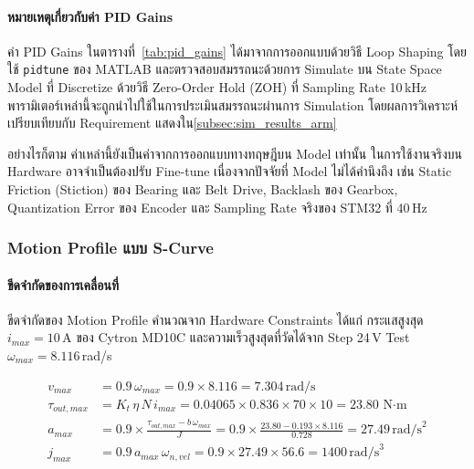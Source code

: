 \paragraph{หมายเหตุเกี่ยวกับค่า PID Gains}

ค่า PID Gains ในตารางที่~\ref{tab:pid_gains} ได้มาจากการออกแบบด้วยวิธี 
Loop Shaping โดยใช้ \texttt{pidtune} ของ MATLAB 
และตรวจสอบสมรรถนะด้วยการ Simulate บน State Space Model 
ที่ Discretize ด้วยวิธี Zero-Order Hold (ZOH) ที่ Sampling Rate 10\,kHz
พารามิเตอร์เหล่านี้จะถูกนำไปใช้ในการประเมินสมรรถนะผ่านการ Simulation โดยผลการวิเคราะห์เปรียบเทียบกับ Requirement แสดงใน\cref{subsec:sim_results_arm}

อย่างไรก็ตาม ค่าเหล่านี้ยังเป็นค่าจากการออกแบบทางทฤษฎีบน Model เท่านั้น
ในการใช้งานจริงบน Hardware อาจจำเป็นต้องปรับ Fine-tune 
เนื่องจากปัจจัยที่ Model ไม่ได้คำนึงถึง เช่น Static Friction (Stiction) 
ของ Bearing และ Belt Drive, Backlash ของ Gearbox, Quantization Error 
ของ Encoder และ Sampling Rate จริงของ STM32 ที่ 40\,Hz

\subsubsection{Motion Profile แบบ S-Curve}
\label{subsubsec:scurve_motion_profile}

\paragraph{ขีดจำกัดของการเคลื่อนที่}

ขีดจำกัดของ Motion Profile คำนวณจาก Hardware Constraints ได้แก่
กระแสสูงสุด $i_{max} = 10$\,A ของ Cytron MD10C
และความเร็วสูงสุดที่วัดได้จาก Step 24\,V Test $\omega_{max} = 8.116$\,rad/s

\begin{align}
  v_{max}  &= 0.9\,\omega_{max}
            = 0.9 \times 8.116 = 7.304\,\text{rad/s}
  \label{eq:vmax}\\
  \tau_{out,max} &= K_t\,\eta\,N\,i_{max}
                 = 0.04065 \times 0.836 \times 70 \times 10
                 = 23.80\,\text{N$\cdot$m}
  \label{eq:taumax}\\
  a_{max}  &= 0.9 \times \frac{\tau_{out,max} - b\,\omega_{max}}{J}
            = 0.9 \times \frac{23.80 - 0.193 \times 8.116}{0.728}
            = 27.49\,\text{rad/s}^2
  \label{eq:amax}\\
  j_{max}  &= 0.9\,a_{max}\,\omega_{n,vel}
            = 0.9 \times 27.49 \times 56.6
            = 1400\,\text{rad/s}^3
  \label{eq:jmax}
\end{align}

